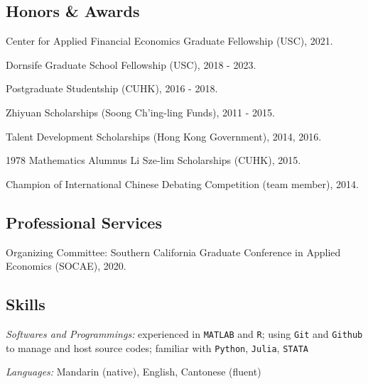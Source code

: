 \documentclass[letterpaper]{article}
\renewenvironment{itemize}{
  \begin{list}{}{
    \setlength{\leftmargin}{1.5em}
    \setlength{\itemsep}{0.25em}
    \setlength{\parskip}{0pt}
    \setlength{\parsep}{0.25em}
  }
}{
  \end{list}
}
\begin{document}
\subsection*{Honors \& Awards}

\begin{itemize}
\item Center for Applied Financial Economics Graduate Fellowship (USC), 2021.
\item Dornsife Graduate School Fellowship (USC), 2018 - 2023.
\item Postgraduate Studentship (CUHK), 2016 - 2018.
\item Zhiyuan Scholarships (Soong Ch’ing-ling Funds),  2011 - 2015.
\item Talent Development Scholarships (Hong Kong Government),  2014, 2016.
\item 1978 Mathematics Alumnus Li Sze-lim Scholarships (CUHK), 2015.
\item Champion of International Chinese Debating Competition (team member), 2014.
\end{itemize}

\subsection*{Professional Services}
Organizing Committee: Southern California Graduate Conference in Applied Economics (SOCAE), 2020.

\subsection*{Skills}

\begin{itemize}
  \item {\it Softwares and Programmings:} experienced in {\tt MATLAB} and {\tt R}; using {\tt Git} and {\tt Github} to manage and host source codes; familiar with {\tt Python}, {\tt Julia}, {\tt STATA}
  \item {\it Languages:} Mandarin (native), English, Cantonese (fluent)
\end{itemize}

\end{document}
